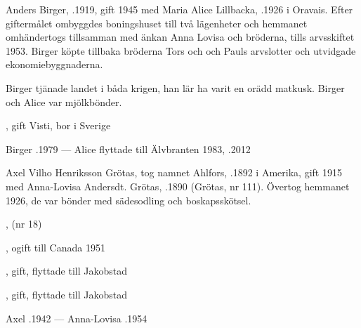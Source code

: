 Anders Birger, .1919, gift 1945 med Maria Alice Lillbacka, .1926 i Oravais. Efter giftermålet ombyggdes boningshuset till två lägenheter och hemmanet omhändertogs tillsamman med änkan Anna Lovisa och bröderna, tills arvsskiftet 1953. Birger köpte tillbaka bröderna Tors och och Pauls arvslotter och utvidgade ekonomiebyggnaderna.

Birger tjänade landet i båda krigen, han lär ha varit en orädd matkusk. Birger och Alice var mjölkbönder.
\begin{jhchildren}
  \item {}, gift Visti, bor i Sverige
  \item {}
\end{jhchildren}

Birger .1979  ---  Alice flyttade till Älvbranten 1983, .2012


Axel Vilho Henriksson Grötas, tog namnet Ahlfors, .1892 i Amerika, gift 1915 med Anna-Lovisa Andersdt. Grötas, .1890 (Grötas, nr 111). Övertog hemmanet 1926, de var bönder med sädesodling och boskapsskötsel.
\begin{jhchildren}
  \item {}
  \item {}, (nr 18)
  \item {}, ogift till Canada 1951
  \item {}, gift, flyttade till Jakobstad
  \item {}, gift, flyttade till Jakobstad
\end{jhchildren}

Axel .1942  ---  Anna-Lovisa .1954


